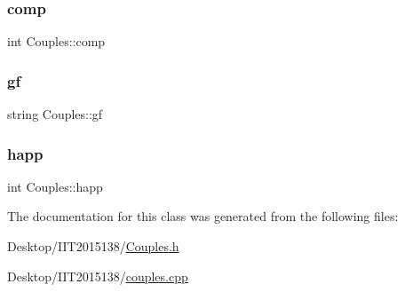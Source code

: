 \mbox{\label{classCouples_a2a40ae5a3c4523fdf2173f7b86d6ac67}} 
\subsubsection{\texorpdfstring{comp}{comp}}
{\footnotesize\ttfamily int Couples\+::comp\hspace{0.3cm}{\ttfamily [private]}}

\mbox{\label{classCouples_a9bf95359b0e7d3684cd30e9491ee9e4c}} 
\subsubsection{\texorpdfstring{gf}{gf}}
{\footnotesize\ttfamily string Couples\+::gf\hspace{0.3cm}{\ttfamily [private]}}

\mbox{\label{classCouples_acd0ababa52b05be34a7ccfc81757c94f}} 
\subsubsection{\texorpdfstring{happ}{happ}}
{\footnotesize\ttfamily int Couples\+::happ\hspace{0.3cm}{\ttfamily [private]}}



The documentation for this class was generated from the following files\+:\begin{DoxyCompactItemize}
\item 
Desktop/\+I\+I\+T2015138/\hyperlink{Couples_8h}{Couples.\+h}\item 
Desktop/\+I\+I\+T2015138/\hyperlink{couples_8cpp}{couples.\+cpp}\end{DoxyCompactItemize}
